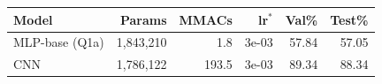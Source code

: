 \begin{tabular}{lrrrrr}
\toprule
Model & Params & MMACs & lr$^*$ & Val\% & Test\% \\
\midrule
MLP-base (Q1a) & 1,843,210 & 1.8 & 3e-03 & 57.84 & 57.05 \\
CNN & 1,786,122 & 193.5 & 3e-03 & 89.34 & 88.34 \\
\bottomrule
\end{tabular}
